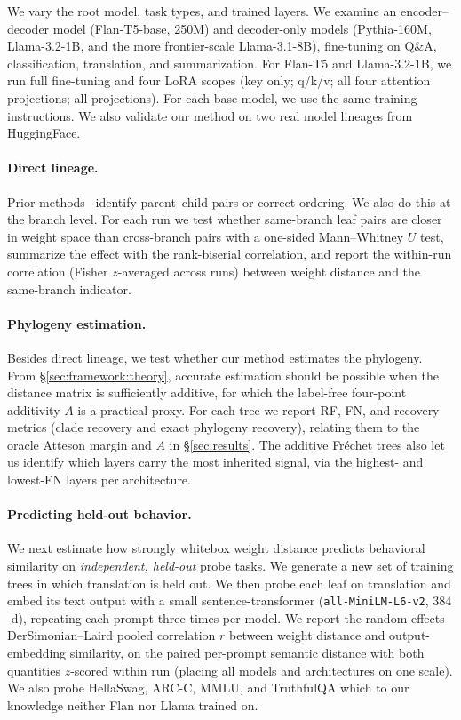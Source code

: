 \documentclass{article}
\theoremstyle{definition}
\theoremstyle{plain}
\begin{document}
We vary the root model, task types, and trained layers. We examine an encoder--decoder model
(Flan-T5-base, 250M) and decoder-only models (Pythia-160M, Llama-3.2-1B, and the more frontier-scale
Llama-3.1-8B), fine-tuning on Q\&A, classification, translation, and summarization. For Flan-T5 and Llama-3.2-1B, we run
full fine-tuning and four LoRA \citep{hu2022lora} scopes (key only; q/k/v; all four attention
projections; all projections). For each base model, we use the same training instructions. We also
validate our method on two real model lineages from HuggingFace.

\paragraph{Direct lineage.}
Prior methods~\citep{horwitz2025mother, yu2025neural} identify parent--child pairs or correct ordering. We also do this at the branch level. For each run we test whether same-branch leaf pairs are closer in weight space than cross-branch pairs with a one-sided Mann--Whitney $U$ test, summarize the effect with the rank-biserial correlation, and report the within-run correlation (Fisher $z$-averaged across runs) between weight distance and the same-branch indicator. 

\paragraph{Phylogeny estimation.}
\label{sec:exp:weights}
Besides direct lineage, we test whether our method estimates the phylogeny. From \S\ref{sec:framework:theory}, accurate estimation should be possible when the distance matrix is sufficiently additive, for which the label-free four-point additivity $A$ is a practical proxy. For each tree we report RF, FN, and recovery metrics (clade recovery and exact phylogeny recovery), relating them to the oracle Atteson margin and $A$ in \S\ref{sec:results}. The additive Fr\'echet trees also let us identify which layers carry the most inherited signal, via the highest- and lowest-FN layers per architecture.


\paragraph{Predicting held-out behavior.}
\label{sec:exp:behavioral}
We next estimate how strongly whitebox weight distance predicts behavioral similarity on \textit{independent, held-out} probe tasks. We generate a new set of training trees in which translation is held out. We then probe each leaf on translation and embed its text output with a small sentence-transformer (\texttt{all-MiniLM-L6-v2}, $384$-d), repeating each prompt three times per model. We report the random-effects DerSimonian--Laird \citep{dersimonianlaird1986} pooled correlation $r$ between weight distance and output-embedding similarity, on the paired per-prompt semantic distance with both quantities $z$-scored within run (placing all models and architectures on one scale). We also probe HellaSwag, ARC-C, MMLU, and TruthfulQA which to our knowledge neither Flan nor Llama trained on.
\end{document}
